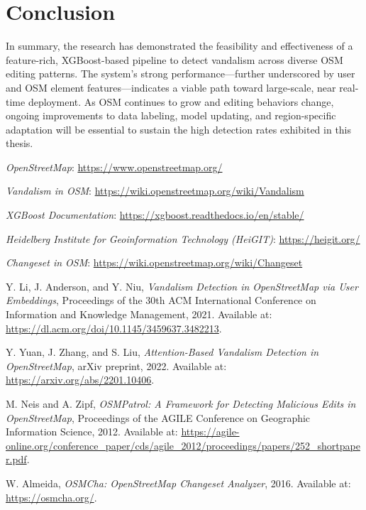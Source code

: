 \documentclass[
    13pt, %
    a4paper, %
    DIV14, %
    listof=totoc, %
    bibliography=totoc, %
    index=totoc, %
    headsepline
]{scrreprt}
\begin{document}
\section{Conclusion}
In summary, the research has demonstrated the feasibility and effectiveness of a feature-rich, XGBoost-based pipeline to detect vandalism across diverse OSM editing patterns. The system's strong performance—further underscored by user and OSM element features—indicates a viable path toward large-scale, near real-time deployment. As OSM continues to grow and editing behaviors change, ongoing improvements to data labeling, model updating, and region-specific adaptation will be essential to sustain the high detection rates exhibited in this thesis.


\begin{thebibliography}{9}

\textit{OpenStreetMap}: \url{https://www.openstreetmap.org/}

\textit{Vandalism in OSM}: \url{https://wiki.openstreetmap.org/wiki/Vandalism}

\textit{XGBoost Documentation}: \url{https://xgboost.readthedocs.io/en/stable/}

\textit{Heidelberg Institute for Geoinformation Technology (HeiGIT)}: \url{https://heigit.org/}

\textit{Changeset in OSM}: \url{https://wiki.openstreetmap.org/wiki/Changeset}

Y. Li, J. Anderson, and Y. Niu,
\textit{Vandalism Detection in OpenStreetMap via User Embeddings},
Proceedings of the 30th ACM International Conference on Information and Knowledge Management, 2021. Available at: \url{https://dl.acm.org/doi/10.1145/3459637.3482213}.

Y. Yuan, J. Zhang, and S. Liu,
\textit{Attention-Based Vandalism Detection in OpenStreetMap},
arXiv preprint, 2022. Available at: \url{https://arxiv.org/abs/2201.10406}.

M. Neis and A. Zipf,
\textit{OSMPatrol: A Framework for Detecting Malicious Edits in OpenStreetMap},
Proceedings of the AGILE Conference on Geographic Information Science, 2012. Available at: \url{https://agile-online.org/conference_paper/cds/agile_2012/proceedings/papers/252_shortpaper.pdf}.

W. Almeida,
\textit{OSMCha: OpenStreetMap Changeset Analyzer},
2016. Available at: \url{https://osmcha.org/}.


\end{thebibliography}
\end{document}
